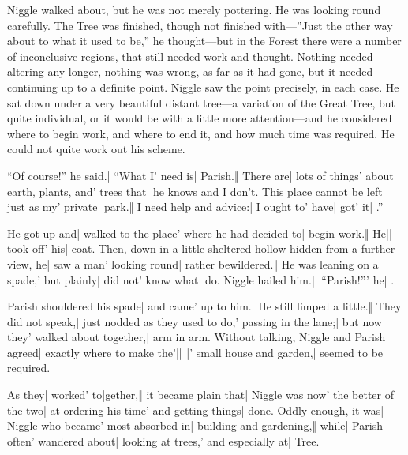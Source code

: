 \onlyscore{\enlargethispage{2\baselineskip}}
Niggle walked about, but he was not merely pottering. He was looking round carefully. The Tree was finished, though not finished with—”Just the other way about to what it used to be,” he thought—but in the Forest there were a number of inconclusive regions, that still needed work and thought. Nothing needed altering any longer, nothing was wrong, as far as it had gone, but it needed continuing up to a definite point. Niggle saw the point precisely, in each case. He sat down under a very beautiful distant tree—a variation of the Great Tree, but quite individual, or it would be with a little more attention—and he considered where to begin work, and where to end it, and how much time was required. He could not quite work out his scheme.

\onlyscore{\bigskip}

\begin{itemize}
\halfone “Of course!” he said.| “What I' need is| Parish.‖ There are| lots of things' about| earth, plants, and' trees that| he knows and I don’t.
\halftwo {}This place cannot be left| just as my' private| park.‖ I need help and advice:|\onlyscore{\linebreak} I ought to' have| got' it| .”
\end{itemize}

\begin{itemize}
\halfone He got up and| walked to the place' where he had decided to| begin work.‖ He|| took off' his| coat.
\halftwo Then, down in a little sheltered hollow hidden from a further view, he| saw a man' looking round| rather bewildered.‖ He was leaning on a| spade,' but plainly| did not' know what|  do.
\quarterfour Niggle hailed him.|| “Parish!”' he| .
\end{itemize}

\begin{itemize}
\halfone Parish shouldered his spade| and came' up to him.| He still limped a little.‖ They did not speak,| just nodded as they used to do,' passing in the lane;| but now they' walked about together,| arm in arm.
\halftwo Without talking, Niggle and Parish agreed| exactly where to make the'|‖||' small house and garden,|  seemed to be required.
\end{itemize}

\begin{itemize}
\halfone As they| worked' to|gether,‖ it became plain that| Niggle was now' the better of the two| at ordering his time' and getting things| done.
\halftwo Oddly enough, it was| Niggle who became' most absorbed in| building and gardening,‖ while| Parish often' wandered about| looking at trees,' and especially at|  Tree.
\end{itemize}

